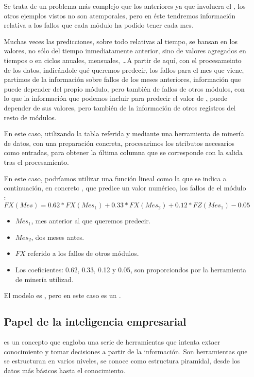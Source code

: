 Se trata de un problema más complejo que los anteriores ya que involucra el , los otros ejemplos vistos no son atemporales, pero en éste tendremos información relativa a los fallos que cada módulo ha podido tener cada mes.

Muchas veces las predicciones, sobre todo relativas al tiempo, se bansan en los valores, no sólo del tiempo inmediatamente anterior, sino de valores agregados en tiempos o en ciclos anuales, mensuales, \ldots A partir de aquí, con el procesameinto de los datos, indicándole qué queremos predecir, los fallos para el mes que viene, partimos de la información sobre fallos de los meses anteriores, información que puede depender del propio módulo, pero también de fallos de otros módulos, con lo que la información que podemos incluir para predecir el valor de , puede depender de sus valores, pero también de la información de otros registros del resto de módulos.

En este caso, utilizando la tabla referida y mediante una herramienta de minería de datos, con una preparación concreta, procesarimos los atributos necesarios como entradas, para obtener la última columna que se corresponde con la salida tras el procesamiento.

En este caso, podríamos utilizar una función lineal como la que se indica a continuación, en concreto , que predice un valor numérico, los fallos de el módulo :
$$FX(Mes) = 0.62\ast FX(Mes_1) + 0.33\ast FX(Mes_2) + 0.12\ast FZ(Mes_1) - 0.05$$

\begin{itemize}
    \item $Mes_1$, mes anterior al que queremos predecir.
    \item $Mes_2$, dos meses antes.
    \item $FX$ referido a los fallos de otros módulos.
    \item Los coeficientes: 0.62, 0.33, 0.12 y 0.05, son proporciondos por la herramienta de minería utilizad.
\end{itemize}

El modelo es , pero en este caso es un .

\subsection{Papel de la inteligencia empresarial}

 es un concepto que engloba una serie de herramientas que intenta extaer conocimiento y tomar decisiones a partir de la información. Son herramientas que se estructuran en varios niveles, se conoce como estructura piramidal, desde los datos más básicos hasta el conocimiento.

